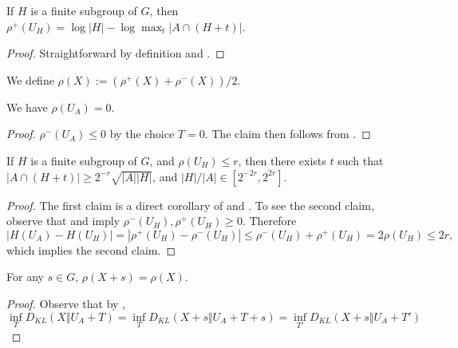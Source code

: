 \begin{corollary}\label{rhoplus-subgroup} If $H$ is a finite subgroup of $G$, then $\rho^+(U_H) = \log |H| - \log \max_t |A \cap (H+t)|$.
\end{corollary}

\begin{proof} Straightforward by definition and .
\end{proof}

\begin{definition}\label{rho-def}\leanok  We define $\rho(X) := (\rho^+(X) + \rho^-(X))/2$.
\end{definition}

\begin{lemma}\label{rho-init}\label{rho_of_uniform}\leanok  We have $\rho(U_A) = 0$.
\end{lemma}

\begin{proof} $\rho^-(U_A)\le 0$ by the choice $T=0$. The claim then follows from .
\end{proof}

\begin{lemma}\label{rho-subgroup}  If $H$ is a finite subgroup of $G$, and $\rho(U_H) \leq r$, then there exists $t$ such that $|A \cap (H+t)| \geq 2^{-r} \sqrt{|A||H|}$, and $|H|/|A|\in[2^{-2r},2^{2r}]$.
\end{lemma}

\begin{proof} The first claim is a direct corollary of  and . To see the second claim, observe that  and  imply $\rho^-(U_H),\rho^+(U_H)\ge 0$. Therefore $$|H(U_A)-H(U_H)|=|\rho^+(U_H)-\rho^-(U_H)|\le \rho^-(U_H)+\rho^+(U_H)= 2\rho(U_H)\le 2r,$$
  which implies the second claim.
\end{proof}

\begin{lemma}\label{rho-invariant}  For any $s \in G$, $\rho(X+s) = \rho(X)$.
\end{lemma}

\begin{proof} Observe that by , $$\inf_T D_{KL}(X\Vert U_A+T)=\inf_T D_{KL}(X+s\Vert U_A+T+s)=\inf_{T'} D_{KL}(X+s\Vert U_A+T')$$
\end{proof}

